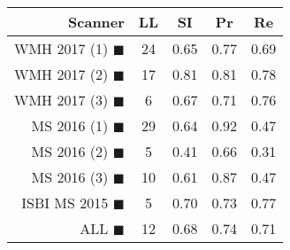 \begin{tabular}{rcccc}
\toprule
Scanner & LL & SI & Pr & Re \\
\midrule
WMH 2017 (1) {\color[rgb]{ 1.00 0.00 0.00}$\blacksquare$} & 24 & 0.65 & 0.77 & 0.69 \\
WMH 2017 (2) {\color[rgb]{ 1.00 0.50 0.00}$\blacksquare$} & 17 & 0.81 & 0.81 & 0.78 \\
WMH 2017 (3) {\color[rgb]{ 1.00 0.80 0.00}$\blacksquare$} & 6 & 0.67 & 0.71 & 0.76 \\
MS  2016 (1) {\color[rgb]{ 0.20 0.80 0.00}$\blacksquare$} & 29 & 0.64 & 0.92 & 0.47 \\
MS  2016 (2) {\color[rgb]{ 0.00 0.40 1.00}$\blacksquare$} & 5 & 0.41 & 0.66 & 0.31 \\
MS  2016 (3) {\color[rgb]{ 0.60 0.00 1.00}$\blacksquare$} & 10 & 0.61 & 0.87 & 0.47 \\
ISBI MS 2015 {\color[rgb]{ 1.00 0.00 1.00}$\blacksquare$} & 5 & 0.70 & 0.73 & 0.77 \\
\midrule
ALL {\color[rgb]{ 1.00 1.00 1.00}$\blacksquare$} & 12 & 0.68 & 0.74 & 0.71 \\
\bottomrule
\end{tabular}